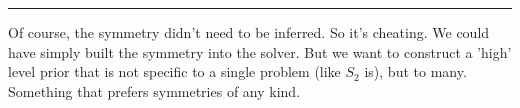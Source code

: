 \begin{center}\rule{0.5\linewidth}{\linethickness}\end{center}

Of course, the symmetry didn't need to be inferred. So it's cheating.
We could have simply built the symmetry into the solver. But we want to
construct a 'high' level prior that is not specific to a single problem (like $S_2$ is), but
to many. Something that prefers symmetries of any kind.
